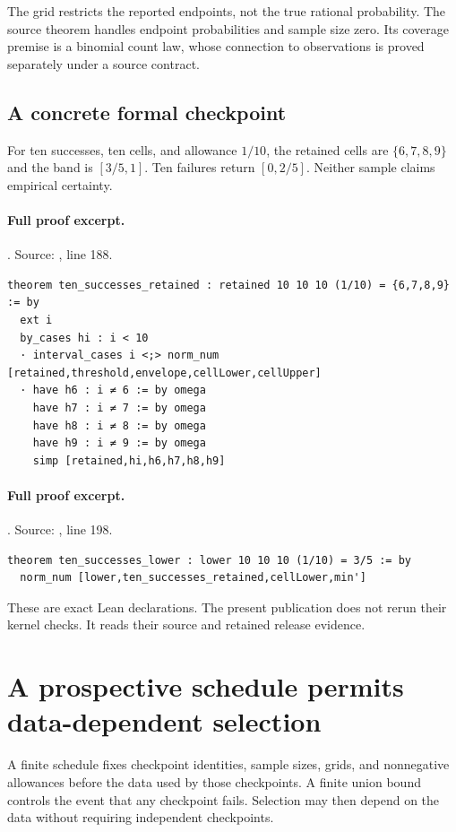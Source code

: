 \documentclass[11pt]{article}
\begin{document}
The grid restricts the reported endpoints, not the true rational probability.
The source theorem handles endpoint probabilities and sample size zero. Its
coverage premise is a binomial count law, whose connection to observations is
proved separately under a source contract.

\subsection{A concrete formal checkpoint}
For ten successes, ten cells, and allowance $1/10$, the retained cells are
$\{6,7,8,9\}$ and the band is $[3/5,1]$. Ten failures return $[0,2/5]$.
Neither sample claims empirical certainty.

\paragraph{Full proof excerpt.}. Source: , line 188.
\begin{lstlisting}[style=AVOCSource]
theorem ten_successes_retained : retained 10 10 10 (1/10) = {6,7,8,9} := by
  ext i
  by_cases hi : i < 10
  · interval_cases i <;> norm_num [retained,threshold,envelope,cellLower,cellUpper]
  · have h6 : i ≠ 6 := by omega
    have h7 : i ≠ 7 := by omega
    have h8 : i ≠ 8 := by omega
    have h9 : i ≠ 9 := by omega
    simp [retained,hi,h6,h7,h8,h9]
\end{lstlisting}

\paragraph{Full proof excerpt.}. Source: , line 198.
\begin{lstlisting}[style=AVOCSource]
theorem ten_successes_lower : lower 10 10 10 (1/10) = 3/5 := by
  norm_num [lower,ten_successes_retained,cellLower,min']
\end{lstlisting}


These are exact Lean declarations. The present publication does not rerun
their kernel checks. It reads their source and retained release evidence.

\section{A prospective schedule permits data-dependent selection}
A finite schedule fixes checkpoint identities, sample sizes, grids, and
nonnegative allowances before the data used by those checkpoints. A finite
union bound controls the event that any checkpoint fails. Selection may then
depend on the data without requiring independent checkpoints.
\end{document}
